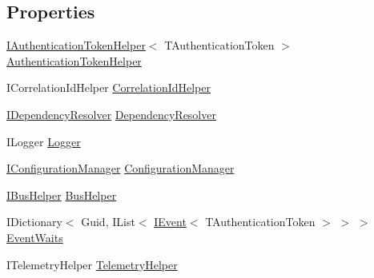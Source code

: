 \subsection*{Properties}
\begin{DoxyCompactItemize}
\item 
\hyperlink{interfaceCqrs_1_1Authentication_1_1IAuthenticationTokenHelper}{I\+Authentication\+Token\+Helper}$<$ T\+Authentication\+Token $>$ \hyperlink{classCqrs_1_1Bus_1_1InProcessBus_a20d068b944183ab04e77c3164d19a860_a20d068b944183ab04e77c3164d19a860}{Authentication\+Token\+Helper}
\item 
I\+Correlation\+Id\+Helper \hyperlink{classCqrs_1_1Bus_1_1InProcessBus_a3ab05953af552331928ca0f1131c269d_a3ab05953af552331928ca0f1131c269d}{Correlation\+Id\+Helper}
\item 
\hyperlink{interfaceCqrs_1_1Configuration_1_1IDependencyResolver}{I\+Dependency\+Resolver} \hyperlink{classCqrs_1_1Bus_1_1InProcessBus_a2eafea26a2848880fdbf84717b8e60e1_a2eafea26a2848880fdbf84717b8e60e1}{Dependency\+Resolver}
\item 
I\+Logger \hyperlink{classCqrs_1_1Bus_1_1InProcessBus_a6d20e32f64b6dfce12852083f0c641c8_a6d20e32f64b6dfce12852083f0c641c8}{Logger}
\item 
\hyperlink{interfaceCqrs_1_1Configuration_1_1IConfigurationManager}{I\+Configuration\+Manager} \hyperlink{classCqrs_1_1Bus_1_1InProcessBus_a403133ecfdbdfa85090366f1d5f95230_a403133ecfdbdfa85090366f1d5f95230}{Configuration\+Manager}
\item 
\hyperlink{interfaceCqrs_1_1Bus_1_1IBusHelper}{I\+Bus\+Helper} \hyperlink{classCqrs_1_1Bus_1_1InProcessBus_a5dd1cb40277f3e04e743dd8cd63523ff_a5dd1cb40277f3e04e743dd8cd63523ff}{Bus\+Helper}
\item 
I\+Dictionary$<$ Guid, I\+List$<$ \hyperlink{interfaceCqrs_1_1Events_1_1IEvent}{I\+Event}$<$ T\+Authentication\+Token $>$ $>$ $>$ \hyperlink{classCqrs_1_1Bus_1_1InProcessBus_a84de47f021786b0400e0635ec68b4ec1_a84de47f021786b0400e0635ec68b4ec1}{Event\+Waits}
\item 
I\+Telemetry\+Helper \hyperlink{classCqrs_1_1Bus_1_1InProcessBus_aeb193bb8b08276db30dd376696726893_aeb193bb8b08276db30dd376696726893}{Telemetry\+Helper}
\end{DoxyCompactItemize}


